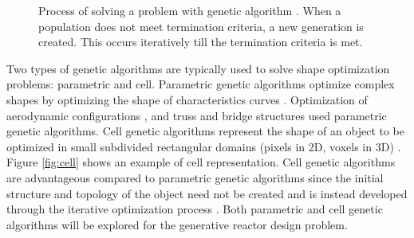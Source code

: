 \documentclass[letterpaper,11pt]{article}
\begin{document}
\begin{figure}[]
        \centering
        \caption{Process of solving a problem with genetic algorithm 
        \cite{renner_genetic_2003}. When a population does not meet termination 
        criteria, a new generation is created. This occurs iteratively till the 
        termination criteria is met. }
        \label{fig:genetic_alg}
\end{figure}

Two types of genetic algorithms are typically used to solve shape 
optimization problems: parametric and cell. 
Parametric genetic algorithms optimize complex shapes by optimizing the shape 
of characteristics curves \cite{renner_genetic_2003}. 
Optimization of aerodynamic configurations \cite{makinen_multidisciplinary_1999}, 
and truss and bridge structures \cite{raich_evolving_2000} used parametric 
genetic algorithms.
Cell genetic algorithms represent the shape of an object to be optimized in 
small subdivided rectangular domains (pixels in 2D, voxels in 3D) 
\cite{renner_genetic_2003}. 
Figure \ref{fig:cell} shows an example of cell representation. 
Cell genetic algorithms are advantageous compared to parametric genetic 
algorithms since the initial structure and topology of the object need not 
be created and is instead developed through the iterative optimization 
process \cite{renner_genetic_2003}. 
Both parametric and cell genetic algorithms will be explored for the generative 
reactor design problem. 
\end{document}
